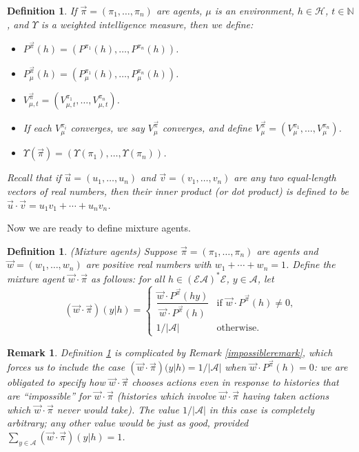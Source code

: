 \documentclass[twoside]{article}
\newtheorem{definition}[theorem]{Definition}
\newtheorem{remark}[theorem]{Remark}
\begin{document}
\begin{definition}
    If $\vec\pi=(\pi_1,\ldots,\pi_n)$ are agents, $\mu$ is an environment,
    $h\in\mathcal H$, $t\in\mathbb N$, and $\Upsilon$ is a weighted
    intelligence measure, then we define:
    \begin{itemize}
        \item ${P^{\vec\pi}}(h)=(P^{\pi_1}(h),\ldots,P^{\pi_n}(h))$.
        \item $P^{\vec\pi}_\mu(h)=(P^{\pi_1}_\mu(h),\ldots,P^{\pi_n}_\mu(h))$.
        \item $V^{\vec\pi}_{\mu,t}=(V^{\pi_1}_{\mu,t},\ldots,V^{\pi_n}_{\mu,t})$.
        \item If each $V^{\pi_i}_\mu$ converges, we say $V^{\vec\pi}_\mu$
            converges, and define $V^{\vec\pi}_\mu=(V^{\pi_1}_\mu,\ldots,V^{\pi_n}_\mu)$.
        \item $\Upsilon(\vec\pi)=(\Upsilon(\pi_1),\ldots,\Upsilon(\pi_n))$.
    \end{itemize}
    Recall that if $\vec u=(u_1,\ldots,u_n)$ and
    $\vec v=(v_1,\ldots,v_n)$ are any two equal-length
    vectors of real numbers, then their \emph{inner product}
    (or \emph{dot product}) is defined to be
    $\vec u\cdot \vec v=u_1v_1+\cdots+u_nv_n$.
\end{definition}

Now we are ready to define mixture agents.

\begin{definition}
\label{maindefn}
    (Mixture agents)
    Suppose $\vec\pi=(\pi_1,\ldots,\pi_n)$ are agents and $\vec w=(w_1,\ldots,w_n)$
    are positive real numbers with $w_1+\cdots+w_n=1$.
    Define the \emph{mixture agent} $\vec w\cdot\vec\pi$ as follows: for all
    $h\in (\mathcal E\mathcal A)^*\mathcal E$, $y\in\mathcal A$, let
    \[
        (\vec w\cdot\vec\pi)(y|h)
        =
        \begin{cases}
            \dfrac{\vec w\cdot {P^{\vec\pi}}(hy)}{\vec w\cdot {P^{\vec\pi}}(h)}
            &\mbox{if $\vec w\cdot {P^{\vec\pi}}(h)\not=0$,}\\
            1/|\mathcal{A}| &\mbox{otherwise.}
        \end{cases}
    \]
\end{definition}

\begin{remark}
    Definition \ref{maindefn} is complicated by Remark \ref{impossibleremark},
    which forces us to include the case
    $(\vec w\cdot\vec\pi)(y|h)=1/|\mathcal A|$ when
    $\vec w\cdot {P^{\vec\pi}}(h)=0$: we are obligated to specify how
    $\vec w\cdot\vec\pi$ chooses actions even in response to histories that
    are ``impossible'' for $\vec w\cdot\vec\pi$ (histories which involve
    $\vec w\cdot\vec\pi$ having taken actions which $\vec w\cdot\vec\pi$
    never would take). The value $1/|\mathcal A|$ in this case is completely arbitrary;
    any other value would be just as good,
    provided $\sum_{y\in\mathcal A}(\vec w\cdot\vec\pi)(y|h)=1$.
\end{remark}
\end{document}

